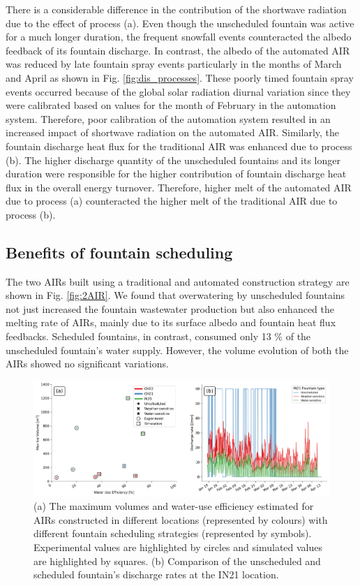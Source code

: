 There is a considerable difference in the contribution of the shortwave radiation due to the effect of process
(a). Even though the unscheduled fountain was active for a much longer duration, the frequent snowfall events
counteracted the albedo feedback of its fountain discharge. In contrast, the albedo of the automated AIR was
reduced by late fountain spray events particularly in the months of March and April as shown in Fig.
\ref{fig:dis_processes}. These poorly timed fountain spray events occurred because of the global solar radiation
diurnal variation since they were calibrated based on values for the month of February in the automation system.
Therefore, poor calibration of the automation system resulted in an increased impact of shortwave radiation on
the automated AIR. Similarly, the fountain discharge heat flux for the traditional AIR was enhanced due to
process (b). The higher discharge quantity of the unscheduled fountains and its longer duration were responsible
for the higher contribution of fountain discharge heat flux in the overall energy turnover. Therefore, higher
melt of the automated AIR due to process (a) counteracted the higher melt of the traditional AIR due to process
(b).

\subsection{Benefits of fountain scheduling}

The two AIRs built using a traditional and automated construction strategy are shown in Fig. \ref{fig:2AIR}. We
found that overwatering by unscheduled fountains not just increased the fountain wastewater production but also
enhanced the melting rate of AIRs, mainly due to its surface albedo and fountain heat flux feedbacks. Scheduled
fountains, in contrast, consumed only 13 \% of the unscheduled fountain's water supply. However, the volume
evolution of both the AIRs showed no significant variations. 

\begin{figure}[htb]
\includegraphics[width=\textwidth]{figs/wue.png}

\caption{(a) The maximum volumes and water-use efficiency estimated for AIRs constructed in different locations
(represented by colours) with different fountain scheduling strategies (represented by symbols). Experimental
values are highlighted by circles and simulated values are highlighted by squares. (b) Comparison of
the unscheduled and scheduled fountain's discharge rates at the IN21 location.}

\label{fig:wue}
\end{figure}


